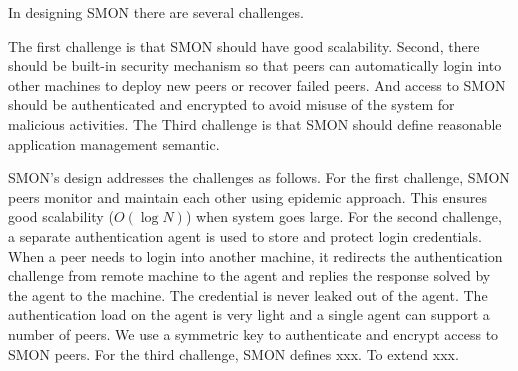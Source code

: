 


In designing SMON there are several challenges.

The first challenge is that SMON should have good
scalability.  Second, there should be built-in security
mechanism so that peers can automatically login into other
machines to deploy new peers or recover failed peers. And
access to SMON should be authenticated and encrypted to
avoid misuse of the system for malicious activities.  The
Third challenge is that SMON should define reasonable
application management semantic.

SMON's design addresses the challenges as follows. For the
first challenge, SMON peers monitor and maintain each other
using epidemic approach. This ensures good scalability
($O(\log N)$) when system goes large. For the second
challenge, a separate authentication agent is used to store
and protect login credentials. When a peer needs to login
into another machine, it redirects the authentication
challenge from remote machine to the agent and replies the
response solved by the agent to the machine.  The credential
is never leaked out of the agent. The authentication load on
the agent is very light and a single agent can support a
number of peers. We use a symmetric key to
authenticate and encrypt access to SMON peers.
For the third challenge, SMON defines xxx. To extend xxx.

